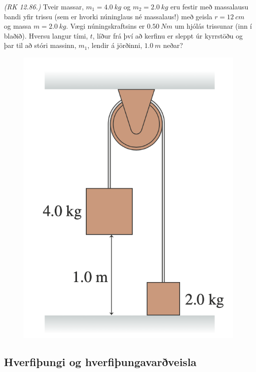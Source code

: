 \ifdefined \wholebook \else\documentclass[oneside]{book}\usepackage{EdlBook}\graphicspath{{figures/}}
\begin{document}
\begin{enumerate}[label = \textbf{Dæmi \thechapter.\arabic*.}]
\begin{minipage}{\linewidth}
\vspace{0.5cm}

\item \textit{(RK 12.86.)} Tveir massar, $m_1 = \SI{4.0}{kg}$ og $m_2 = \SI{2.0}{kg}$ eru festir með massalausu bandi yfir trissu (sem er hvorki núninglaus né massalaus!) með geisla $r = \SI{12}{cm}$ og massa $m = \SI{2.0}{kg}$. Vægi núningskraftsins er $\SI{0.50}{Nm}$ um hjólás trissunar (inn í blaðið). Hversu langur tími, $t$, líður frá því að kerfinu er sleppt úr kyrrstöðu og þar til að stóri massinn, $m_1$, lendir á jörðinni, $\SI{1.0}{m}$ neðar?
\end{minipage}

\begin{figure}[H]
    \centering
    \includegraphics[scale = 0.45]{images/atwoopalaca.png}
\end{figure}


\subsection*{Hverfiþungi og hverfiþungavarðveisla}


\end{enumerate}
\end{document}
